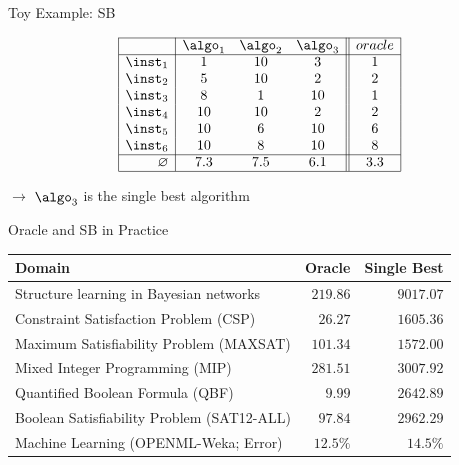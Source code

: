 \begin{frame}[c]{Toy Example: SB}

\[
\begin{array}{| r | c  c  c || c |}
  \cline{1-5}
      & \algo_1 & \algo_2 & \algo_3 & oracle\\
  \cline{1-5}
  \inst_1 & 		 1    &         10  &         3    & 1 \\
  \inst_2 &          5    &         10  &  		2 	  & 2 \\
  \inst_3 &          8    &  		1    &         10  & 1 \\
  \inst_4 &         10  &         10  & 		2 	  & 2 \\
  \inst_5 &         10  & 		 6    &         10  & 6 \\
  \inst_6 &         10  &          8    &         10  & 8 \\
  \cline{1-5}
  \varnothing & 7.3 & 7.5 & 6.1 & 3.3\\
  \cline{1-5}
\end{array}
\]

\bigskip

$\to$ $\algo_3$ is the single best algorithm

\end{frame}
\begin{frame}[c]{Oracle and SB in Practice}

\begin{tabular}{lrr}
\toprule
Domain 										& Oracle 	& Single Best \\
\midrule
Structure learning in Bayesian networks 	& $219.86$ 	& $9017.07$\\
Constraint Satisfaction Problem (CSP)		& $26.27$	& $1605.36$ \\
Maximum Satisfiability Problem (MAXSAT) 	& $101.34$	& $1572.00$\\
Mixed Integer Programming (MIP)				& $281.51$	& $3007.92$\\
Quantified Boolean Formula (QBF)			& $9.99$	& $2642.89$	\\
Boolean Satisfiability Problem 	(SAT12-ALL)	& $97.84$	& $2962.29$\\
\midrule
Machine Learning (OPENML-Weka; Error)		& $12.5\%$	& $14.5\%$\\
\bottomrule
\end{tabular}


\end{frame}
